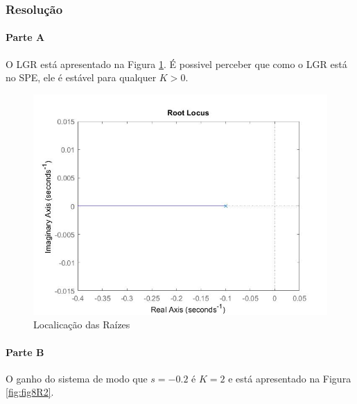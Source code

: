 \documentclass[
]{book}
\theoremstyle{definition}
\theoremstyle{definition}
\theoremstyle{definition}
\theoremstyle{remark}
\begin{document}
\hypertarget{resoluuxe7uxe3o-22}{%
\subsubsection*{Resolução}\label{resoluuxe7uxe3o-22}}

\hypertarget{parte-a-9}{%
\paragraph{Parte A}\label{parte-a-9}}

O LGR está apresentado na Figura \ref{fig:fig8R1}. É possivel perceber que como o LGR está no SPE, ele é estável para qualquer \(K > 0\).

\begin{figure}

{\centering \includegraphics{Imagens/Lab8/Resolução/fig1} 

}

\caption{Localicação das Raízes}\label{fig:fig8R1}
\end{figure}

\hypertarget{parte-b-9}{%
\paragraph{Parte B}\label{parte-b-9}}

O ganho do sistema de modo que \(s = -0.2\) é \(K = 2\) e está apresentado na Figura \ref{fig:fig8R2}.
\end{document}
